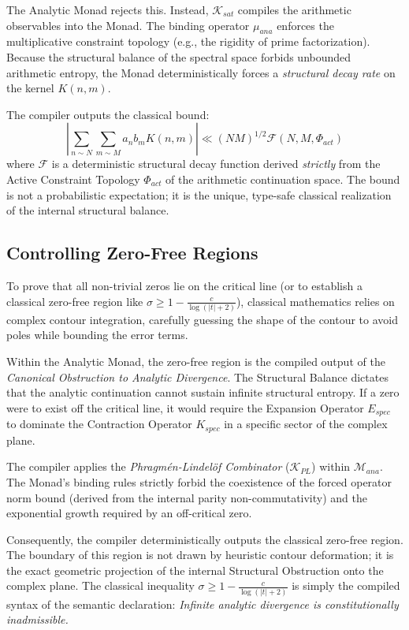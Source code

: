 \documentclass[12pt,openany]{extbook}
\theoremstyle{plain}
\theoremstyle{definition}
\begin{document}
The Analytic Monad rejects this. Instead, $\mathcal{K}_{sat}$ compiles the arithmetic observables into the Monad. The binding operator $\mu_{ana}$ enforces the multiplicative constraint topology (e.g., the rigidity of prime factorization). Because the structural balance of the spectral space forbids unbounded arithmetic entropy, the Monad deterministically forces a \emph{structural decay rate} on the kernel $K(n,m)$. 

The compiler outputs the classical bound:
\[
\left| \sum_{n \sim N} \sum_{m \sim M} a_n b_m K(n,m) \right| \ll (NM)^{1/2} \mathcal{F}(N, M, \Phi_{act})
\]
where $\mathcal{F}$ is a deterministic structural decay function derived \emph{strictly} from the Active Constraint Topology $\Phi_{act}$ of the arithmetic continuation space. The bound is not a probabilistic expectation; it is the unique, type-safe classical realization of the internal structural balance.

\subsection{Controlling Zero-Free Regions}
To prove that all non-trivial zeros lie on the critical line (or to establish a classical zero-free region like $\sigma \geq 1 - \frac{c}{\log(|t|+2)}$), classical mathematics relies on complex contour integration, carefully guessing the shape of the contour to avoid poles while bounding the error terms.

Within the Analytic Monad, the zero-free region is the compiled output of the \emph{Canonical Obstruction to Analytic Divergence}. The Structural Balance dictates that the analytic continuation cannot sustain infinite structural entropy. If a zero were to exist off the critical line, it would require the Expansion Operator $E_{spec}$ to dominate the Contraction Operator $K_{spec}$ in a specific sector of the complex plane.

The compiler applies the \emph{Phragmén-Lindelöf Combinator} ($\mathcal{K}_{PL}$) within $\mathcal{M}_{ana}$. The Monad's binding rules strictly forbid the coexistence of the forced operator norm bound (derived from the internal parity non-commutativity) and the exponential growth required by an off-critical zero. 

Consequently, the compiler deterministically outputs the classical zero-free region. The boundary of this region is not drawn by heuristic contour deformation; it is the exact geometric projection of the internal Structural Obstruction onto the complex plane. The classical inequality $\sigma \geq 1 - \frac{c}{\log(|t|+2)}$ is simply the compiled syntax of the semantic declaration: \emph{Infinite analytic divergence is constitutionally inadmissible.}
\end{document}
